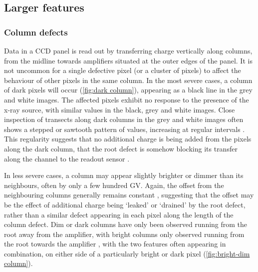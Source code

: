 \documentclass[\main/IO-Pixels.tex]{subfiles}
\begin{document}

\subsection{Larger features}

\subsubsection{Column defects}

\label{sec:column-defects}


Data in a CCD panel is read out by transferring charge vertically along columns,  from the midline towards amplifiers situated at the outer edges of the panel. It is not uncommon for a single defective pixel (or a cluster of pixels) to affect the behaviour of other pixels in the same column. In the most severe cases, a column of dark pixels will occur (\autoref{fig:dark column}), appearing as a black line in the grey and white images. The affected pixels exhibit no response to the presence of the x-ray source, with similar values in the black, grey and white images. Close inspection of transects along dark columns in the grey and white images often shows a stepped or sawtooth pattern of values, increasing at regular intervals  . This regularity suggests that no additional charge is being added from the pixels along the dark column, that the root defect is somehow blocking its transfer along the channel to the readout sensor .

In less severe cases, a column may appear slightly brighter or dimmer than its neighbours, often by only a few hundred GV. Again, the offset from the neighbouring columns generally remains constant , suggesting that the offset may be the effect of additional charge being `leaked' or `drained' by the root defect, rather than a similar defect appearing in each pixel along the length of the column defect. Dim or dark columns have only been observed running from the root away from the amplifier, with bright columns only observed running from the root towards the amplifier , with the two features often appearing in combination, on either side of a particularly bright or dark pixel (\autoref{fig:bright-dim column}).
\end{document}
